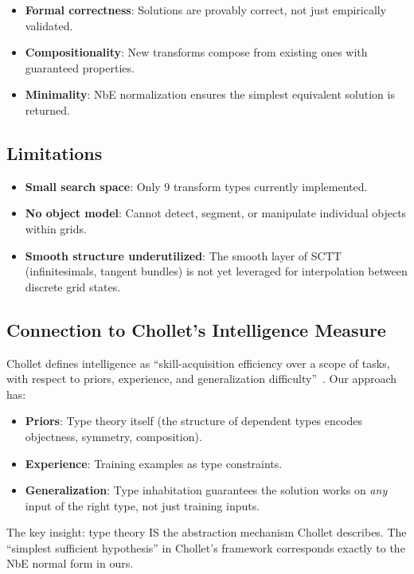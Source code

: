 \documentclass[11pt,a4paper]{article}
\begin{document}
\begin{itemize}[nosep]
  \item \textbf{Formal correctness}: Solutions are provably correct,
    not just empirically validated.
  \item \textbf{Compositionality}: New transforms compose from
    existing ones with guaranteed properties.
  \item \textbf{Minimality}: NbE normalization ensures the simplest
    equivalent solution is returned.
\end{itemize}

\subsection{Limitations}

\begin{itemize}[nosep]
  \item \textbf{Small search space}: Only 9 transform types currently
    implemented.
  \item \textbf{No object model}: Cannot detect, segment, or
    manipulate individual objects within grids.
  \item \textbf{Smooth structure underutilized}: The smooth layer of
    SCTT (infinitesimals, tangent bundles) is not yet leveraged for
    interpolation between discrete grid states.
\end{itemize}

\subsection{Connection to Chollet's Intelligence Measure}

Chollet defines intelligence as ``skill-acquisition efficiency over a
scope of tasks, with respect to priors, experience, and
generalization difficulty''~\cite{Chollet2019}.  Our approach
has:
\begin{itemize}[nosep]
  \item \textbf{Priors}: Type theory itself (the structure of
    dependent types encodes objectness, symmetry, composition).
  \item \textbf{Experience}: Training examples as type constraints.
  \item \textbf{Generalization}: Type inhabitation guarantees the
    solution works on \emph{any} input of the right type, not just
    training inputs.
\end{itemize}

The key insight: type theory IS the abstraction mechanism Chollet
describes.  The ``simplest sufficient hypothesis'' in Chollet's
framework corresponds exactly to the NbE normal form in ours.
\end{document}
